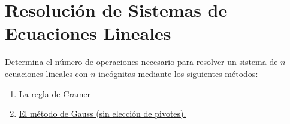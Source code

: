 \section{Resolución de Sistemas de Ecuaciones Lineales}

\begin{ejercicio}
   Determina el número de operaciones necesario para resolver un sistema de $n$ ecuaciones lineales con $n$ incógnitas mediante los siguientes métodos:

   \begin{enumerate}
       \item \underline{La regla de Cramer}

       \item \underline{El método de Gauss (sin elección de pivotes).}
   \end{enumerate}
\end{ejercicio}

